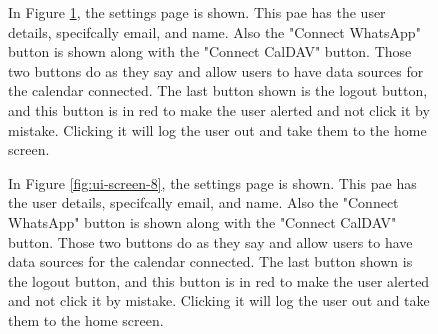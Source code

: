 \begin{figure}[!h]
\begin{minipage}{0.3\textwidth}
        \label{fig:ui-screen-7}
    \end{minipage}
    \hfill
    \begin{minipage}{0.65\textwidth}
        In Figure \ref{fig:ui-screen-7}, the settings page is shown. This pae has the user details, specifcally email, and name. Also the "Connect WhatsApp" button is shown along with the "Connect CalDAV" button. Those two buttons do as they say and allow users to have data sources for the calendar connected. The last button shown is the logout button, and this button is in red to make the user alerted and not click it by mistake. Clicking it will log the user out and take them to the home screen.
    \end{minipage}
\end{figure}

\begin{figure}[!h]
    \begin{minipage}{0.65\textwidth}
        In Figure \ref{fig:ui-screen-8}, the settings page is shown. This pae has the user details, specifcally email, and name. Also the "Connect WhatsApp" button is shown along with the "Connect CalDAV" button. Those two buttons do as they say and allow users to have data sources for the calendar connected. The last button shown is the logout button, and this button is in red to make the user alerted and not click it by mistake. Clicking it will log the user out and take them to the home screen.
    \end{minipage}
    \hfill
    \begin{minipage}{0.3\textwidth}
        \centering

\end{minipage}
\end{figure}
